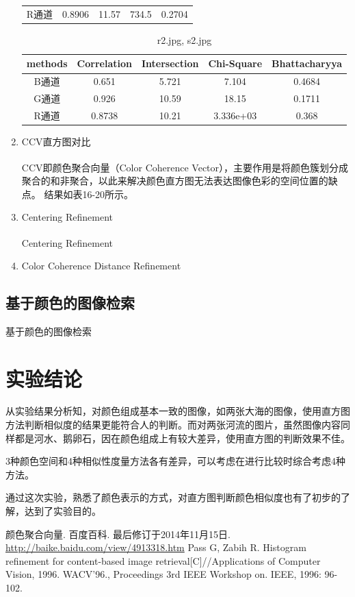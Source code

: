 \documentclass[a4paper, 12pt, UTF8]{article}
\begin{document}
\begin{enumerate}
\begin{table}[h!]
\begin{tabular}{ccccc}
        R通道 & 0.8906 & 11.57 & 734.5 & 0.2704 \\
    \end{tabular}
\end{table}
\begin{table}[h!]
    \centering
    \caption{r2.jpg, s2.jpg}
    \begin{tabular}{ccccc}
        methods & Correlation & Intersection & Chi-Square & Bhattacharyya \\ \hline
        B通道 & 0.651 & 5.721 & 7.104 & 0.4684 \\
        G通道 & 0.926 & 10.59 & 18.15 & 0.1711 \\
        R通道 & 0.8738 & 10.21 & 3.336e+03 & 0.368 \\
    \end{tabular}
\end{table}

\item CCV直方图对比

CCV即颜色聚合向量（Color Coherence Vector）\textsuperscript{\cite{ref1}}，主要作用是将颜色簇划分成聚合的和非聚合，以此来解决颜色直方图无法表达图像色彩的空间位置的缺点。
结果如表16-20所示。

\item Centering Refinement

Centering Refinement \textsuperscript{\cite{ref2}}

\item Color Coherence Distance Refinement

\end{enumerate}


\subsection{基于颜色的图像检索}

基于颜色的图像检索


\section{实验结论}

从实验结果分析知，对颜色组成基本一致的图像，如两张大海的图像，使用直方图方法判断相似度的结果更能符合人的判断。而对两张河流的图片，虽然图像内容同样都是河水、鹅卵石，因在颜色组成上有较大差异，使用直方图的判断效果不佳。

3种颜色空间和4种相似性度量方法各有差异，可以考虑在进行比较时综合考虑4种方法。

通过这次实验，熟悉了颜色表示的方式，对直方图判断颜色相似度也有了初步的了解，达到了实验目的。


\renewcommand{\refname}{参考}
\begin{thebibliography}{9}
 颜色聚合向量. 百度百科. 最后修订于2014年11月15日. \url{http://baike.baidu.com/view/4913318.htm}
 Pass G, Zabih R. Histogram refinement for content-based image retrieval[C]//Applications of Computer Vision, 1996. WACV'96., Proceedings 3rd IEEE Workshop on. IEEE, 1996: 96-102.
\end{thebibliography}
\end{document}

